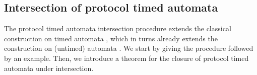
\subsection{Intersection of protocol timed automata}


The protocol timed automata intersection procedure extends the classical construction on timed automata \cite{RADLD94}, which in turns already extends the construction on (untimed) automata \cite{Hopcroft79}. We start by giving the procedure followed by an example. Then, we introduce a theorem for the closure of protocol timed automata under intersection.

